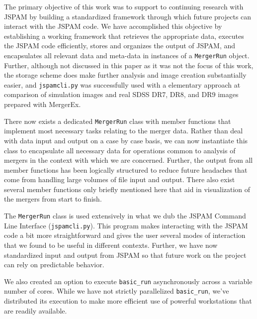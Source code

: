 The primary objective of this work was to support to continuing research with
JSPAM by building a standardized framework through which future projects can
interact with the JSPAM code.
We have accomplished this objective by establishing a working framework
that retrieves the appropriate data, executes the JSPAM code efficiently, stores
and organizes the output of JSPAM, and encapsulates all relevant data and
meta-data in instances of a \texttt{MergerRun} object.
Further, although not discussed in this paper as it was not the focus of this
work, the storage scheme does make further analysis and image creation
substantially easier, and \texttt{jspamcli.py} was successfully used
with a elementary approach at comparison of simulation images and real SDSS DR7, DR8,
and DR9 images prepared with MergerEx.

There now exists a dedicated
\texttt{MergerRun} class with member functions that implement most necessary tasks
relating to the merger data. Rather than deal with data input and output
on a case by case
basis, we can now instantiate this class to encapsulate all necessary data for
operations common to analysis of mergers in the context with which we are
concerned. Further, the output from all member functions has been logically
structured to reduce future headaches that come from handling large volumes
of file input and output.
There also exist several member functions only briefly mentioned here that aid in visualization
of the mergers from start to finish.

The \texttt{MergerRun} class is used extensively in what we dub the JSPAM Command
Line Interface (\texttt{jspamcli.py}). This program makes interacting with
the JSPAM code a bit more straightforward and gives the user several modes of
interaction that we found to be useful in different contexts. Further, we have
now standardized input and output from JSPAM so that future work on the project can rely on
predictable behavior.

We also created an option to execute \texttt{basic\_run} asynchronously across
a variable number of cores. While we have not strictly parallelized
\texttt{basic\_run}, we've distributed its execution to make more efficient use
of powerful workstations that are readily available.
